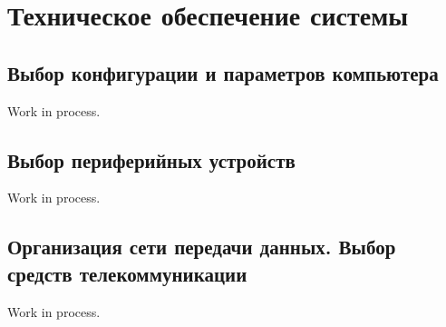 \section{Техническое обеспечение системы}

\subsection{Выбор конфигурации и параметров компьютера}

Work in process.

\subsection{Выбор периферийных устройств}

Work in process.

\subsection{Организация сети передачи данных. Выбор средств телекоммуникации}

Work in process.

\clearpage
\newpage
